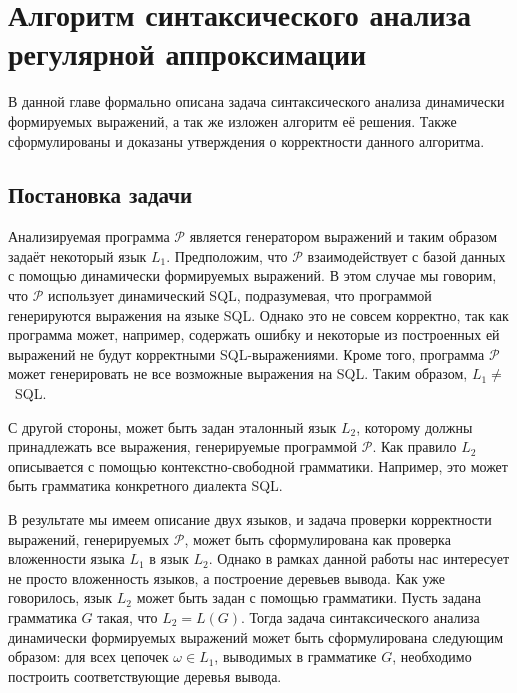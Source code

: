 \chapter{Алгоритм синтаксического анализа регулярной аппроксимации} \label{AlgoDescr}

В данной главе формально описана задача синтаксического анализа динамически формируемых выражений, а так же изложен алгоритм её решения. Также сформулированы и доказаны утверждения о корректности данного алгоритма.

\section{Постановка задачи}

Анализируемая программа $\mathcal{P}$ является генератором выражений и таким образом задаёт некоторый язык $L_1$. Предположим, что $\mathcal{P}$ взаимодействует с базой данных с помощью динамически формируемых выражений. В этом случае мы говорим, что $\mathcal{P}$ использует динамический SQL, подразумевая, что программой генерируются выражения на языке SQL. Однако это не совсем корректно, так как программа может, например, содержать ошибку и некоторые из построенных ей выражений не будут корректными SQL-выражениями. Кроме того, программа $\mathcal{P}$ может генерировать не все возможные выражения на SQL. Таким образом, $L_1\neq$~SQL.

С другой стороны, может быть задан эталонный язык $L_2$, которому должны принадлежать все выражения, генерируемые программой $\mathcal{P}$. Как правило $L_2$ описывается с помощью контекстно-свободной грамматики. Например, это может быть грамматика конкретного диалекта SQL.

В результате мы имеем описание двух языков, и задача проверки корректности выражений, генерируемых $\mathcal{P}$, может быть сформулирована как проверка вложенности языка $L_1$ в язык $L_2$. Однако в рамках данной работы нас интересует не просто вложенность языков, а построение деревьев вывода. Как уже говорилось, язык $L_2$ может быть задан с помощью грамматики. Пусть задана грамматика $G$ такая, что $L_2 = L(G)$. Тогда задача синтаксического анализа динамически формируемых выражений может быть сформулирована следующим образом: для всех цепочек $\omega \in L_1$, выводимых в грамматике $G$, необходимо построить соответствующие деревья вывода.

